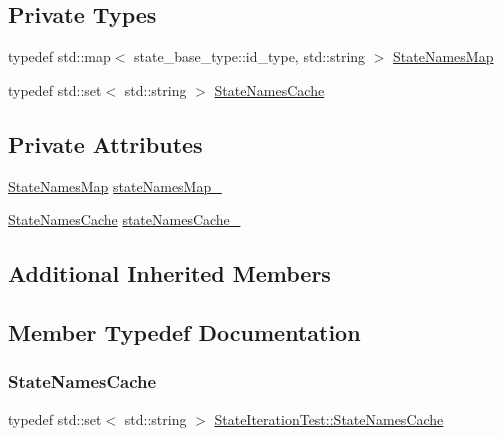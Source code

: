 \subsection*{Private Types}
\begin{DoxyCompactItemize}
\item 
typedef std\+::map$<$ state\+\_\+base\+\_\+type\+::id\+\_\+type, std\+::string $>$ \mbox{\hyperlink{struct_state_iteration_test_ad2b113061c6f1d153adf3013b32e75c0}{State\+Names\+Map}}
\item 
typedef std\+::set$<$ std\+::string $>$ \mbox{\hyperlink{struct_state_iteration_test_a7650cbecc238cfbab3f9ff1f6707a826}{State\+Names\+Cache}}
\end{DoxyCompactItemize}
\subsection*{Private Attributes}
\begin{DoxyCompactItemize}
\item 
\mbox{\hyperlink{struct_state_iteration_test_ad2b113061c6f1d153adf3013b32e75c0}{State\+Names\+Map}} \mbox{\hyperlink{struct_state_iteration_test_ac5d2940aa9baaa9d1f6e08a5563792f4}{state\+Names\+Map\+\_\+}}
\item 
\mbox{\hyperlink{struct_state_iteration_test_a7650cbecc238cfbab3f9ff1f6707a826}{State\+Names\+Cache}} \mbox{\hyperlink{struct_state_iteration_test_a49903d50153012f61f1807953c233bad}{state\+Names\+Cache\+\_\+}}
\end{DoxyCompactItemize}
\subsection*{Additional Inherited Members}


\subsection{Member Typedef Documentation}
\mbox{\label{struct_state_iteration_test_a7650cbecc238cfbab3f9ff1f6707a826}} 
\subsubsection{\texorpdfstring{State\+Names\+Cache}{StateNamesCache}}
{\footnotesize\ttfamily typedef std\+::set$<$ std\+::string $>$ \mbox{\hyperlink{struct_state_iteration_test_a7650cbecc238cfbab3f9ff1f6707a826}{State\+Iteration\+Test\+::\+State\+Names\+Cache}}\hspace{0.3cm}{\ttfamily [private]}}

